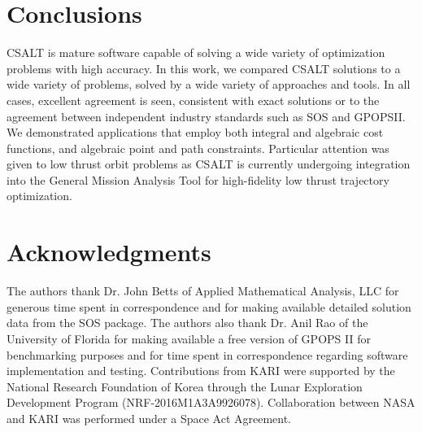\documentclass[ISTS  ]{tjsass} %
\begin{document}
\section{Conclusions}

CSALT is mature software capable of solving a wide variety of optimization problems with high accuracy.  In this work, we compared CSALT solutions to a wide variety of problems, solved by a wide variety of approaches and tools.  In all cases, excellent agreement is seen, consistent with exact solutions or to the agreement between independent industry standards such as SOS and GPOPSII.  We demonstrated applications that employ both integral and algebraic cost functions, and algebraic point and path constraints.  Particular attention was given to low thrust orbit problems as CSALT is currently undergoing integration into the General Mission Analysis Tool for high-fidelity low thrust trajectory optimization.

\section*{Acknowledgments}\label{Acknowledgments}

The authors thank Dr. John Betts of Applied Mathematical Analysis, LLC for generous time spent in correspondence and for making available detailed solution data from the SOS package.  The authors also thank Dr. Anil Rao of the University of Florida for making available a free version of GPOPS II for benchmarking purposes and for time spent in correspondence regarding software implementation and testing. Contributions from KARI were supported by the National Research Foundation of Korea through the Lunar Exploration Development Program (NRF-2016M1A3A9926078).  Collaboration between NASA and KARI was performed under a Space Act Agreement.
\end{document}
